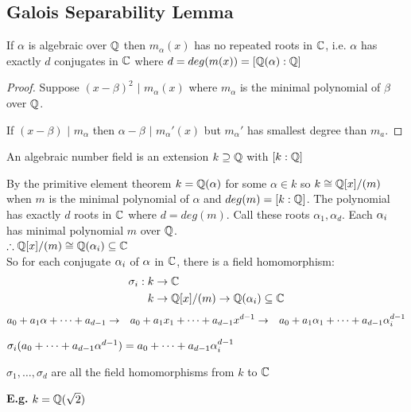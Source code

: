 \documentclass[11pt]{article}
\begin{document}
\subsection{Galois Separability Lemma}
\begin{lemma}
	If $\alpha$ is algebraic over $\mathbb{Q}$ then $m_{\alpha}(x)$ has no repeated roots in $\mathbb{C}$, i.e. $\alpha$ has exactly $d$ conjugates in $\mathbb{C}$ where $d = deg(m(x)) = [\mathbb{Q}(\alpha) : \mathbb{Q}]$
\end{lemma}


\begin{proof}
	Suppose $(x-\beta)^2$ $|$ $ m_\alpha(x) $ where $m_\alpha$ is the minimal polynomial of $\beta$ over $\mathbb{Q}$.

	If $(x-\beta)$ $ | $ $ m_\alpha$ then $\alpha - \beta $ $ | $ $ m_\alpha '(x) $ but $m_\alpha'$ has smallest degree than $m_a$. \lightning


\end{proof}

\begin{defn}
	An algebraic number field is an extension $k \supseteq \mathbb{Q}$ with $[k: \mathbb{Q}]$
\end{defn}
$ $\\[-0.5em]
By the primitive element theorem $k = \mathbb{Q} (\alpha)$ for some $\alpha \in k$ so $k \cong \mathbb{Q}[x] /(m) $ when $m$ is the minimal polynomial of $\alpha$ and $ deg(m) = [k: \mathbb{Q}]$.
The polynomial has exactly $d$ roots in $\mathbb{C}$ where $d= deg(m)$. 
Call these roots $\alpha_1, \alpha_d$. 
Each $\alpha_i$ has minimal polynomial $m$ over $\mathbb{Q}$.
$ $\\[1em]
$\therefore \mathbb{Q}[x] /(m) \cong \mathbb{Q}(\alpha_i) \subseteq \mathbb{C}$
$ $\\[-0.5em]

So for each conjugate $\alpha_i$ of $\alpha $ in $\mathbb{C}$, there is a field homomorphism:
\begin{align*}
	\sigma_i : k &\to \mathbb{C}\\
	 k &\to \mathbb{Q}[x]/(m) \to \mathbb{Q}(\alpha_i) \subseteq \mathbb{C}\\
\end{align*}
\vspace{-3em}
\begin{align*}
	a_0 +a_1\alpha + \dots + a_{d-1} &\to& a_0+a_1x_1+\dots+a_{d-1}x^{d-1} &\to& a_0+a_1\alpha_1 + \dots + a_{d-1}\alpha_i^{d-1} 
\end{align*}


$ \sigma_i (a_0 + \dots + a_{d-1} \alpha^{d-1}) = a_0 +\dots + a_{d-1}\alpha_i^{d-1}$
\begin{prop}
$\sigma_1, \dots, \sigma_d$ are all the field homomorphisms from $k $ to $\mathbb{C}$
\end{prop}
$ $\\[-0.5em]
\textbf{E.g.} $k = \mathbb{Q}(\sqrt{2})$
\end{document}
